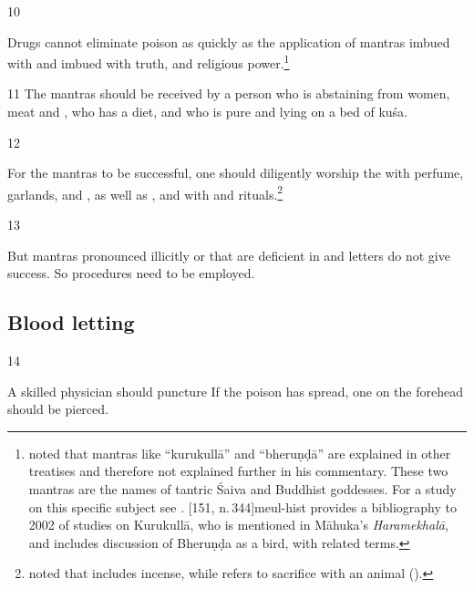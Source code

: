 \begin{translation}
\item [10]

Drugs cannot eliminate poison as quickly as the application of mantras
imbued with  and imbued with truth,
 and religious power.\footnote{
    noted that mantras like “kurukullā” and “bheruṇḍā” are explained in other
    treatises and therefore not explained further in his commentary. These
    two mantras are the names of tantric Śaiva and Buddhist goddesses. For a
    study on this specific subject see \citet{slou-2016b}. [151,
    n.\,344]{meul-hist} provides a bibliography to 2002 of studies on
    Kurukullā, who is mentioned in Māhuka's \emph{Haramekhalā}, and
    \cite[30--34]{meul-2008b} includes discussion of Bheruṇḍa as a bird, with
    related terms.} 

\item [11] The mantras should be received by a person who is
abstaining from women, meat and , who has a
 diet, and who is pure and lying on a bed of \gls{kuśa}.

\item [12]

For the mantras to be successful, one should diligently worship the
 with perfume, garlands, and ,
as well as , and with  and rituals.\footnote{ noted that
     includes incense, while  refers to sacrifice
    with an animal ().}


\item [13]

But mantras pronounced illicitly or that are deficient in
 and letters do not give success.  So
 procedures need to be employed.

\subsection{Blood letting}

\item [14]

A skilled physician should puncture  If the poison has spread, one on the forehead should be
pierced.


\end{translation}

